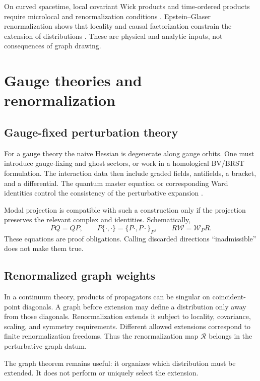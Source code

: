 \documentclass[11pt,a4paper]{article}
\begin{document}
On curved spacetime, local covariant Wick products and time-ordered
products require microlocal and renormalization conditions
\cite{BrunettiFredenhagen2000,HollandsWald2001,HollandsWald2002}.
Epstein--Glaser renormalization shows that locality and causal
factorization constrain the extension of distributions
\cite{EpsteinGlaser1973}.  These are physical and analytic inputs, not
consequences of graph drawing.

\section{Gauge theories and renormalization}

\subsection{Gauge-fixed perturbation theory}

For a gauge theory the naive Hessian is degenerate along gauge orbits.
One must introduce gauge-fixing and ghost sectors, or work in a
homological BV/BRST formulation.  The interaction data then include
graded fields, antifields, a bracket, and a differential.  The quantum
master equation or corresponding Ward identities control the consistency
of the perturbative expansion \cite{Rejzner2016}.

Modal projection is compatible with such a construction only if the
projection preserves the relevant complex and identities.  Schematically,
\[
 PQ=QP,\qquad
 P\{\cdot,\cdot\}=\{P\cdot,P\cdot\}_P,
\qquad
 R\mathcal W=\mathcal W_P R.
\]
These equations are proof obligations.  Calling discarded directions
``inadmissible'' does not make them true.

\subsection{Renormalized graph weights}

In a continuum theory, products of propagators can be singular on
coincident-point diagonals.  A graph before extension may define a
distribution only away from those diagonals.  Renormalization extends it
subject to locality, covariance, scaling, and symmetry requirements.
Different allowed extensions correspond to finite renormalization
freedoms.  Thus the renormalization map \(\mathcal R\) belongs in the
perturbative graph datum.

The graph theorem remains useful: it organizes which distribution must be
extended.  It does not perform or uniquely select the extension.
\end{document}
